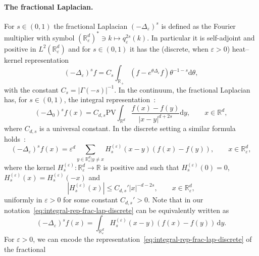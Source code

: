 \documentclass{article}
\numberwithin{equation}{section}
\newcommand{\mathd}{\mathrm{d}}
\theoremstyle{plain}
\theoremstyle{definition}
\begin{document}
\paragraph*{The fractional Laplacian.} For $s \in (0, 1)$ the fractional
Laplacian $(- \Delta_{\varepsilon})^s$ is defined as the Fourier multiplier
with symbol $(\mathbb{R}_{\varepsilon}^d)^{\ast} \ni k \mapsto
q_{\varepsilon}^{2 s} (k)$. In particular it is self-adjoint and positive in
$L^2 (\mathbb{R}^d_{\varepsilon})$ and for $s \in (0, 1)$ it has the
(discrete, when $\varepsilon > 0$) heat--kernel
representation~{\cite{kwasnickiTenEquivalentDefinitions2017}}
\begin{equation}
  (- \Delta_{\varepsilon})^s f = C_s  \int_{\mathbb{R}_+} (f - e^{\theta
  \Delta_{\varepsilon}} f) \theta^{- 1 - s} \mathd \theta,
  \label{eq:fractional-laplacian-heat-kernel}
\end{equation}
with the constant $C_s = | \Gamma (- s) |^{- 1}$. In the continuum, the
fractional Laplacian has, for $s \in (0, 1)$, the integral
representation~{\cite{kwasnickiTenEquivalentDefinitions2017}}:
\begin{equation}
  (- \Delta_0)^s f (x) = C_{d, s}  \text{PV} \int_{\mathbb{R}^d} \frac{f (x) -
  f (y)}{| x - y |^{d + 2 s}} \mathd y, \qquad x \in \mathbb{R}^d,
  \label{eq:integral-repr-frac-lapl-cont}
\end{equation}
where $C_{d, s}$ is a universal constant. In the discrete setting a similar
formula holds~{\cite{ciaurriFractionalDiscreteLaplacian2015}}:
\begin{equation}
  (- \Delta_{\varepsilon})^s f (x) = \varepsilon^d  \sum_{y \in
  \mathbb{R}_{\varepsilon}^d | y \neq x} H^{(\varepsilon)}_s (x - y)  (f (x) -
  f (y)), \qquad x \in \mathbb{R}_{\varepsilon}^d,
  \label{eq:integral-rep-frac-lap-discrete}
\end{equation}
where the kernel $H^{(\varepsilon)}_s : \mathbb{R}_{\varepsilon}^d \rightarrow
\mathbb{R}$ is positive and such that $H^{(\varepsilon)}_s (0) = 0$,
$H^{(\varepsilon)}_s (x) = H^{(\varepsilon)}_s (- x)$ and
\[ | H^{(\varepsilon)}_s (x) | \leqslant C_{d, s}'  | x |^{- d - 2 s}, \qquad
   x \in \mathbb{R}_{\varepsilon}^d, \]
uniformly in $\varepsilon > 0$ for some constant $C_{d, s}' > 0$.
Note that in our
notation~\eqref{eq:integral-rep-frac-lap-discrete} can be equivalently written
as
\[ (- \Delta_{\varepsilon})^s f (x) =
   \int_{\mathbb{R}_{\varepsilon}^d} H^{(\varepsilon)}_s (x - y)  (f (x) - f
   (y))\,\mathd y. \]
For $\varepsilon > 0$, we can encode the
representation~\eqref{eq:integral-rep-frac-lap-discrete} of the fractional
\end{document}
